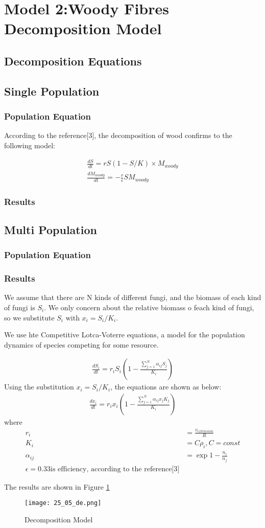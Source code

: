 \section{Model 2:Woody Fibres Decomposition Model}
	\subsection{Decomposition Equations}
	\subsection{Single Population}
		\subsubsection{Population Equation}
		According to the reference[3], the decomposition of wood confirms to the following model:

\begin{align}
    \frac{dS}{dt}=rS(1-S/K)\times M_{woody}\\
    \frac{dM_{woody}}{dt}=-\frac{r}{\epsilon}SM_{woody}
\end{align}
		\subsubsection{Results}
	\subsection{Multi Population}
		\subsubsection{Population Equation}
		\subsubsection{Results}
	

We assume that there are N kinds of different fungi, and the biomass of each kind of fungi is $S_i$. We only concern about the relative biomass o feach kind of fungi, so we substitute $S_i$ with $x_i=S_i/K_i$.

We use hte Competitive Lotca-Voterre equations, a model for the population dynamics of species competing for some resource. 

\begin{align}
    \frac{dS_i}{dt}=r_i S_i  (1- \frac{\sum_{j=1}^{N}\alpha_{ij}S_j}{K_i})
\end{align}
Using the substitution $x_i=S_i/K_i$, the equations are shown as below:
\begin{align}
    \frac{dx_i}{dt}=r_i x_i  (1- \frac{\sum_{j=1}^{N}\alpha_{ij}x_jK_j}{K_i})
\end{align}
where
\begin{align}
    r_i&=\frac{v_{extension}}{R}\\
    K_i&=C\rho_i,C=const\\
    \alpha_{ij}&=\exp{1-\frac{n_i}{n_j}}\\
    \epsilon=0.33\text{is efficiency, according to the reference[3]}
\end{align}

The results are shown in Figure \ref{fig:result}

\begin{figure}[H]
	\centering
	\texttt{[image: 25\_05\_de.png]}
	\caption{Decomposition Model}\label{fig:result}
\end{figure}
